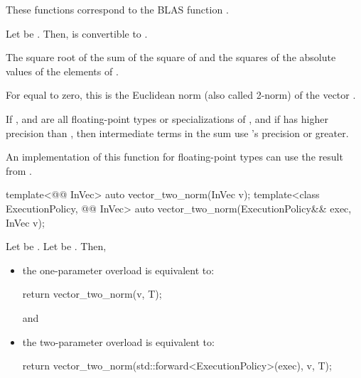 \begin{itemdescr}
\pnum
\begin{note}
These functions correspond to the BLAS function \supercite{blas1}.
\end{note}

\pnum
\mandates
Let  be
.
Then,  is convertible to .

\pnum
\returns
The square root of the sum of the square of  and the squares of the absolute values of the elements of .
\begin{note}
For  equal to zero, this is the Euclidean norm
(also called 2-norm) of the vector .
\end{note}

\pnum
\remarks
If , and 
are all floating-point types or specializations of ,
and if  has higher precision
than ,
then intermediate terms in the sum use 's precision or greater.
\begin{note}
An implementation of this function for floating-point types 
can use the  result from
.
\end{note}
\end{itemdescr}

\begin{itemdecl}
template<@@ InVec>
  auto vector_two_norm(InVec v);
template<class ExecutionPolicy, @@ InVec>
  auto vector_two_norm(ExecutionPolicy&& exec, InVec v);
\end{itemdecl}

\begin{itemdescr}
\pnum
\effects
Let  be
.
Let  be .
Then,
\begin{itemize}
\item
the one-parameter overload is equivalent to:
\begin{codeblock}
return vector_two_norm(v, T{});
\end{codeblock}
and
\item
the two-parameter overload is equivalent to:
\begin{codeblock}
return vector_two_norm(std::forward<ExecutionPolicy>(exec), v, T{});
\end{codeblock}
\end{itemize}
\end{itemdescr}

